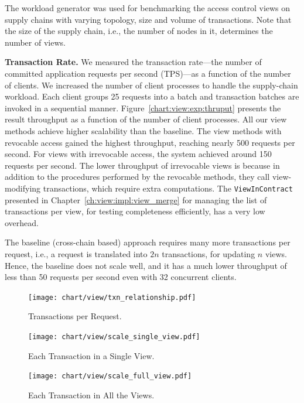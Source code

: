 The workload generator was used for benchmarking the access control views on supply chains with varying topology, size and volume of transactions. Note that the size of the supply chain, i.e., the number of nodes in it, determines the number of views.


\medskip
\noindent
\textbf{Transaction Rate.}
We measured the transaction rate---the number of committed application requests per second (TPS)---as a function of the number of clients. 
We increased the number of client processes to handle the supply-chain workload. 
Each client groups 25 requests into a batch and transaction batches are invoked in a sequential manner. 
Figure~\ref{chart:view:exp:thruput} presents the result throughput as a function of the number of client processes. 
All our view methods achieve higher scalability than the baseline.  The view methods with revocable access gained the highest throughput, reaching nearly 500 requests per second. 
For views with irrevocable access, the system achieved around 150 requests per second. 
The lower throughput of irrevocable views is because in addition to the procedures performed by the revocable methods, they call view-modifying transactions, which require extra computations.
The  \texttt{ViewInContract} presented in Chapter~\ref{ch:view:impl:view_merge}
for managing the list of transactions per view, for testing completeness efficiently, has a very low overhead.

The baseline (cross-chain based) approach requires many more transactions per request, i.e., a request is translated into $2n$ transactions, for updating $n$ views. Hence, the baseline does not scale well, and it has a much lower throughput of less than 50 requests per second even with 32 concurrent clients. 


\begin{figure}[tp]
	\begin{minipage}[t]{0.32\textwidth}
		\centering
        \texttt{[image: chart/view/txn\_relationship.pdf]}
        \caption{Transactions per Request.}
        \label{chart:view:exp:txn_relationship}
	\end{minipage}
	\hfill
	\begin{minipage}[t]{0.32\textwidth}
		\centering
        \texttt{[image: chart/view/scale\_single\_view.pdf]}
        \caption{Each Transaction in a Single View.}
        \label{chart:view:exp:single_view}
	\end{minipage}
    \hfill
	\begin{minipage}[t]{0.32\textwidth}
		\centering
        \texttt{[image: chart/view/scale\_full\_view.pdf]}
        \caption{Each Transaction in All the Views.}
        \label{chart:view:exp:all_view}
	\end{minipage}
\end{figure}


